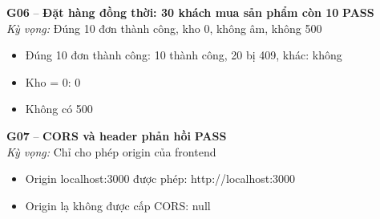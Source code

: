 \documentclass[a4paper,11pt]{article}
\newcommand{\ok}{\textcolor{okgreen}{\textbf{PASS}}}
\begin{document}
\begin{minipage}{\textwidth}\vspace{4pt}\textbf{\textcolor{brew}{G06}} -- \textbf{Đặt hàng đồng thời: 30 khách mua sản phẩm còn 10} \hfill \ok\\
{\small\emph{Kỳ vọng:} Đúng 10 đơn thành công, kho 0, không âm, không 500}
\end{minipage}
\begin{itemize}\footnotesize
\item \tick Đúng 10 đơn thành công: 10 thành công, 20 bị 409, khác: không
\item \tick Kho = 0: 0
\item \tick Không có 500
\end{itemize}
\begin{minipage}{\textwidth}\vspace{4pt}\textbf{\textcolor{brew}{G07}} -- \textbf{CORS và header phản hồi} \hfill \ok\\
{\small\emph{Kỳ vọng:} Chỉ cho phép origin của frontend}
\end{minipage}
\begin{itemize}\footnotesize
\item \tick Origin localhost:3000 được phép: http://localhost:3000
\item \tick Origin lạ không được cấp CORS: null
\end{itemize}
\end{document}
